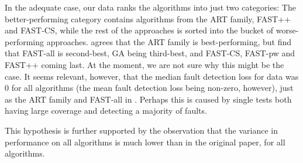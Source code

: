 In the adequate case, our data ranks the algorithms into just two
categories: The better-performing category contains algorithms
from the ART family, FAST++ and FAST-CS, while the rest of
the approaches is sorted into the bucket of worse-performing
approaches. \cite{cruciani2019scalable} agrees that the ART family
is best-performing, but find that FAST-all is second-best, GA being
third-best, and FAST-CS, FAST-pw and FAST++ coming last. At the moment,
we are not sure why this might be the case. It seems relevant, however,
that the median fault detection loss for data was 0 for all algorithms
(the mean fault detection loss being non-zero, however), just as the
ART family and FAST-all in \cite{cruciani2019scalable}.  Perhaps this
is caused by single tests both having large coverage and detecting a
majority of faults.

This hypothesis is further supported by the observation that the variance
in performance on all algorithms is much lower than in the original paper,
for all algorithms.


